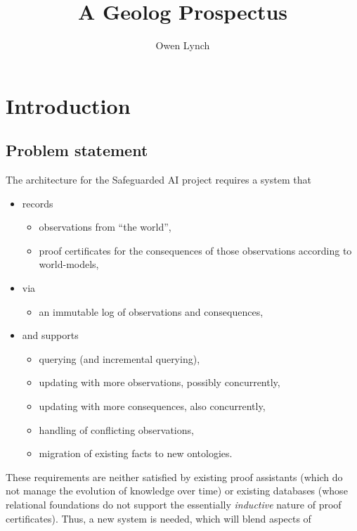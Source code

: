 \documentclass{article}
\title{A Geolog Prospectus}
\author{Owen Lynch}
\begin{document}
\maketitle

\section{Introduction}

\subsection{Problem statement}
The architecture for the Safeguarded AI project requires a system that

\begin{itemize}
  \item records
        \begin{itemize}
          \item observations from ``the world'',
          \item proof certificates for the consequences of those observations according to world-models,
        \end{itemize}
  \item via
        \begin{itemize}
          \item an immutable log of observations and consequences,
        \end{itemize}
  \item and supports
        \begin{itemize}
          \item querying (and incremental querying),
          \item updating with more observations, possibly concurrently,
          \item updating with more consequences, also concurrently,
          \item handling of conflicting observations,
          \item migration of existing facts to new ontologies.
        \end{itemize}
\end{itemize}

These requirements are neither satisfied by existing proof assistants (which do not manage the evolution of knowledge over time) or existing databases (whose relational foundations do not support the essentially \emph{inductive} nature of proof certificates). Thus, a new system is needed, which will blend aspects of
\end{document}
